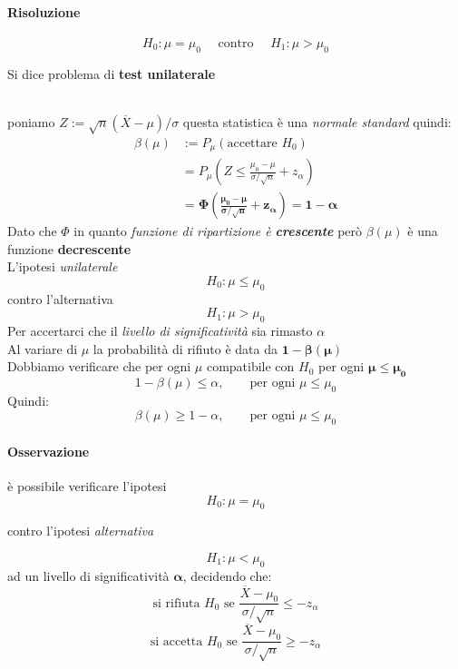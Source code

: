 \documentclass[]{article}
\begin{document}
    \paragraph{Risoluzione}
    \[ H_0 : \mu = \mu_0 \quad \text{ contro } \quad H_1 : \mu > \mu_0 \]
    \centerline{Si dice problema di \textbf{test unilaterale}} \\[2ex]
    poniamo $Z := \sqrt{n}(\overline{X} - \mu) / \sigma$ questa statistica è una \textit{normale standard} quindi:
    \begin{equation*}
        \begin{split}
            \beta(\mu) &:= P_\mu(\text{accettare } H_0) \\
            &= P_\mu \left( Z \leq \frac{\mu_0 - \mu}{\sigma / \sqrt{n}} + z_\alpha \right) \\
            &= \boldsymbol{\Phi \left( \frac{\mu_0 - \mu}{\sigma / \sqrt{n}} + z_\alpha \right) = 1 - \alpha}
        \end{split}
    \end{equation*}
    Dato che $\Phi$ in quanto \textit{funzione di ripartizione è \textbf{crescente}} però $\beta(\mu)$ è una funzione \textbf{decrescente} \\
    L'ipotesi \textit{unilaterale}
    \[ H_0 : \mu \leq \mu_0 \]
    contro l'alternativa
    \[ H_1 : \mu > \mu_0 \]
    Per accertarci che il \textit{livello di significatività} sia rimasto $\alpha$ \\
    Al variare di $\mu$ la probabilità di rifiuto è data da $\boldsymbol{1 - \beta(\mu)}$ \\
    Dobbiamo verificare che per ogni $\mu$ compatibile con $H_0$ per ogni $\boldsymbol{\mu \leq \mu_0}$ 
    \[ 1 - \beta(\mu) \leq \alpha, \qquad \text{per ogni } \mu \leq \mu_0 \]
    Quindi:
    \[ \beta(\mu) \geq 1 - \alpha, \qquad \text{per ogni } \mu \leq \mu_0 \]
    \paragraph{Osservazione} è possibile verificare l'ipotesi
    \[ H_0 : \mu = \mu_0 \]
    \centerline{contro l'ipotesi \textit{alternativa}}
    \[ H_1 : \mu < \mu_0 \]
    ad un livello di significatività $\boldsymbol{\alpha}$, decidendo che:
    \[ \text{si rifiuta } H_0 \text{ se } \frac{\overline{X} - \mu_0}{\sigma / \sqrt{n}} \leq -z_\alpha \]
    \[ \text{si accetta } H_0 \text{ se } \frac{\overline{X} - \mu_0}{\sigma / \sqrt{n}} \geq -z_\alpha \]
\end{document}
